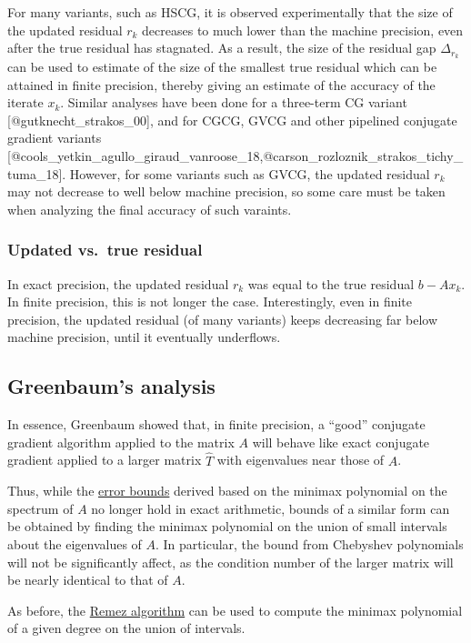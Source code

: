 \documentclass[10pt]{article}
\begin{document}
For many variants, such as HSCG, it is observed experimentally that the size of the updated residual \(r_k\) decreases to much lower than the machine precision, even after the true residual has stagnated.
As a result, the size of the residual gap \(\Delta_{r_k}\) can be used to estimate of the size of the smallest true residual which can be attained in finite precision, thereby giving an estimate of the accuracy of the iterate \(x_k\).
Similar analyses have been done for a three-term CG variant {[}@gutknecht\_strakos\_00{]}, and for CGCG, GVCG and other pipelined conjugate gradient variants {[}@cools\_yetkin\_agullo\_giraud\_vanroose\_18,@carson\_rozloznik\_strakos\_tichy\_tuma\_18{]}.
However, for some variants such as GVCG, the updated residual \(r_k\) may not decrease to well below machine precision, so some care must be taken when analyzing the final accuracy of such varaints.

\subsubsection{Updated vs.~true residual}

In exact precision, the updated residual \(r_k\) was equal to the true residual \(b-Ax_k\).
In finite precision, this is not longer the case.
Interestingly, even in finite precision, the updated residual (of many variants) keeps decreasing far below machine precision, until it eventually underflows.

\subsection{Greenbaum's analysis}

In essence, Greenbaum showed that, in finite precision, a ``good'' conjugate gradient algorithm applied to the matrix \(A\) will behave like exact conjugate gradient applied to a larger matrix \(\hat{T}\) with eigenvalues near those of \(A\).

Thus, while the \href{./cg_error.html}{error bounds} derived based on the minimax polynomial on the spectrum of \(A\) no longer hold in exact arithmetic, bounds of a similar form can be obtained by finding the minimax polynomial on the union of small intervals about the eigenvalues of \(A\). In particular, the bound from Chebyshev polynomials will not be significantly affect, as the condition number of the larger matrix will be nearly identical to that of \(A\).

As before, the \href{./remez.html}{Remez algorithm} can be used to compute the minimax polynomial of a given degree on the union of intervals.
\end{document}
